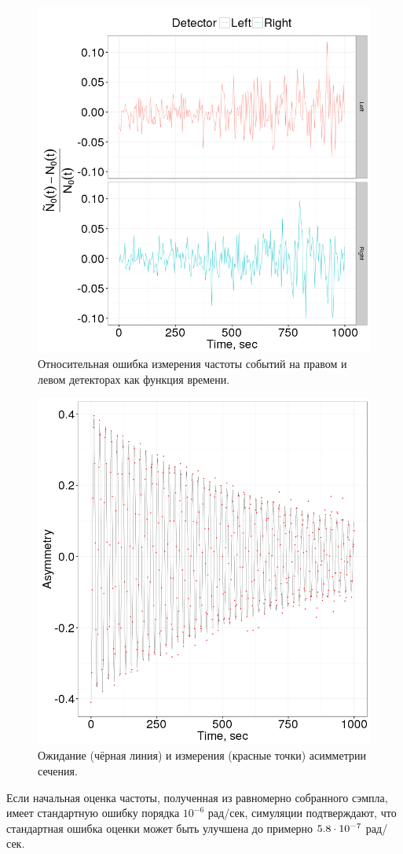 \begin{figure}[h]
	\centering
	\includegraphics[width=\textwidth]{images/App_Stats/LR_detector_relErr}
	\caption{Относительная ошибка измерения частоты событий на правом и левом
		детекторах как функция времени.\label{fig:LRDetErr}}
\end{figure}

\begin{figure}[h]
	\centering
	\includegraphics[width=\textwidth]{images/App_Stats/Asymmetry}
	\caption{Ожидание (чёрная линия) и измерения (красные точки)
		асимметрии сечения.\label{fig:Asym}}
\end{figure}

Если начальная оценка частоты, полученная из равномерно собранного
сэмпла, имеет стандартную ошибку порядка $10^{-6}$ рад/сек, симуляции
подтверждают, что стандартная ошибка оценки может быть улучшена до примерно ${5.8}\cdot 10^{-7}$ рад/сек.

